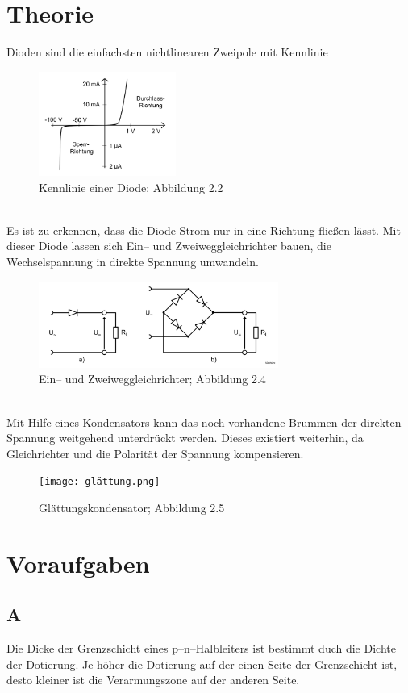 \documentclass[a4paper,12pt]{article}
\numberwithin{equation}{section}
\begin{document}
\section{Theorie}
Dioden sind die einfachsten nichtlinearen Zweipole mit Kennlinie
\begin{figure}[h]
        \centering
        \includegraphics[width=0.4\textwidth]{diode_kennlinie.png}
        \caption{Kennlinie einer Diode; Abbildung 2.2 \cite{Praktikumsanleitung}}
\end{figure}\\
Es ist zu erkennen, dass die Diode Strom nur in eine Richtung fließen lässt.
Mit dieser Diode lassen sich Ein-- und Zweiweggleichrichter bauen, die Wechselspannung in direkte Spannung umwandeln.
\begin{figure}[h]
        \centering
        \includegraphics[width=0.7\textwidth]{ein_zweiweggleichrichter.png}
        \caption{Ein-- und Zweiweggleichrichter; Abbildung 2.4 \cite{Praktikumsanleitung}}
\end{figure}\\
Mit Hilfe eines Kondensators kann das noch vorhandene Brummen der direkten Spannung weitgehend unterdrückt werden.
Dieses existiert weiterhin, da Gleichrichter und die Polarität der Spannung kompensieren.
\begin{figure}[h]
        \centering
        \texttt{[image: glättung.png]}
        \caption{Glättungskondensator; Abbildung 2.5 \cite{Praktikumsanleitung}}
\end{figure}

\clearpage
\section{Voraufgaben}
\subsection{A}
Die Dicke der Grenzschicht eines p--n--Halbleiters ist bestimmt duch die Dichte der Dotierung.
Je höher die Dotierung auf der einen Seite der Grenzschicht ist, desto kleiner ist die Verarmungszone auf der anderen Seite.
\end{document}
